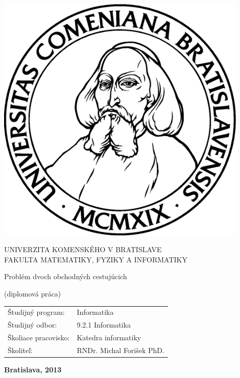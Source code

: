 \documentclass[12pt,a4paper]{book}
\begin{document}
\thispagestyle{empty}
\begin{minipage}{0.25\textwidth}
\includegraphics[width=0.9\textwidth]{img/komlogo-new}
\end{minipage}
\begin{minipage}{0.69\textwidth}
\begin{center}
UNIVERZITA KOMENSKÉHO V BRATISLAVE \\
FAKULTA MATEMATIKY, FYZIKY A INFORMATIKY \\
\end{center}
\end{minipage}

\vfill
\begin{center}
\begin{minipage}{0.8\textwidth}
\bigskip\medskip
\centerline{\LARGE\sc Problém dvoch obchodných cestujúcich}
\smallskip
\centerline{(diplomová práca)}
\bigskip
\bigskip
\bigskip\bigskip
\end{minipage}
\end{center}
\vfill
\begin{tabular}{l l}
Študijný program: & Informatika \\
Študijný odbor: & 9.2.1 Informatika \\
Školiace pracovisko: & Katedra informatiky \\
Školiteľ: & RNDr. Michal Forišek PhD. \\
\end{tabular}
\vfill
{\bf Bratislava, 2013}
\end{document}
